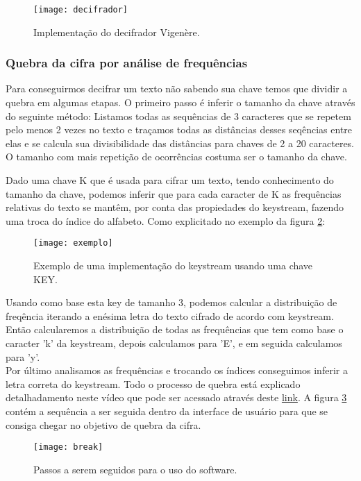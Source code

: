 \documentclass[10pt]{article}
\begin{document}
\begin{figure}[H]
  \texttt{[image: decifrador]}
  \centering
  \caption{Implementação do decifrador Vigenère.}
  \label{fig:decifrador}
\end{figure}

\subsubsection{Quebra da cifra por análise de frequências}

Para conseguirmos decifrar um texto não sabendo sua chave temos que dividir a quebra em algumas etapas.
O primeiro passo é inferir o tamanho da chave através do seguinte método:
Listamos todas as sequências de 3 caracteres que se repetem pelo menos 2 vezes no texto e traçamos todas as distâncias desses 
seqências entre elas e se calcula sua divisibilidade das distâncias para chaves de 2 a 20 caracteres.
O tamanho com mais repetição de ocorrências costuma ser o tamanho da chave.


Dado uma chave K que é usada para cifrar um texto, tendo conhecimento do tamanho da chave, podemos inferir que 
para cada caracter de K as frequências relativas do texto se mantêm, por conta das propiedades do keystream,
fazendo uma troca do índice do alfabeto. Como explicitado no exemplo da figura \ref{fig:ex}:

\begin{figure}[h]
  \texttt{[image: exemplo]}
  \centering
  \caption{Exemplo de uma implementação do keystream usando uma chave KEY.}
  \label{fig:ex}
\end{figure}

Usando como base esta key de tamanho 3, podemos calcular a distribuição de freqência iterando a enésima letra do texto cifrado de acordo com
keystream. Então calcularemos a distribuição de todas as frequências que tem como base o caracter 'k' da keystream, depois calculamos para 'E', 
e em seguida calculamos para 'y'.\\
Por último analisamos as frequências e trocando os índices conseguimos inferir a letra correta do keystream.
Todo o processo de quebra está explicado detalhadamento neste vídeo que pode ser acessado através deste \href{https://youtu.be/NIzf1nHWtfs}{link}.
A figura \ref{fig:tela} contém a sequência a ser seguida dentro da interface de usuário para que se consiga chegar no objetivo de 
quebra da cifra.
\begin{figure}[h]
  \texttt{[image: break]}
  \centering
  \caption{Passos a serem seguidos para o uso do software.}
  \label{fig:tela}
\end{figure}
\end{document}
